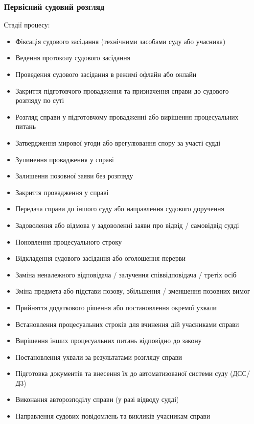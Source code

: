 \documentclass{article}
\begin{document}
\newpage
\subsubsection{Первісний судовий розгляд}

Стадії процесу:

\begin{itemize}
    \item Фіксація судового засідання (технічними засобами суду або учасника)
    \item Ведення протоколу судового засідання
    \item Проведення судового засідання в режимі офлайн або онлайн
    \item Закриття підготовчого провадження та призначення справи до судового розгляду по суті
    \item Розгляд справи у підготовчому провадженні або вирішення процесуальних питань
    \item Затвердження мирової угоди або врегулювання спору за участі судді
    \item Зупинення провадження у справі
    \item Залишення позовної заяви без розгляду
    \item Закриття провадження у справі
    \item Передача справи до іншого суду або направлення судового доручення
    \item Задоволення або відмова у задоволенні заяви про відвід / самовідвід судді
    \item Поновлення процесуального строку
    \item Відкладення судового засідання або оголошення перерви
    \item Заміна неналежного відповідача / залучення співвідповідача / третіх осіб
    \item Зміна предмета або підстави позову, збільшення / зменшення позовних вимог
    \item Прийняття додаткового рішення або постановлення окремої ухвали
    \item Встановлення процесуальних строків для вчинення дій учасниками справи
    \item Вирішення інших процесуальних питань відповідно до закону
    \item Постановлення ухвали за результатами розгляду справи
    \item Підготовка документів та внесення їх до автоматизованої системи суду (ДСС/Д3)
    \item Виконання авторозподілу справи (у разі відводу судді)
    \item Направлення судових повідомлень та викликів учасникам справи
\end{itemize}
\end{document}
